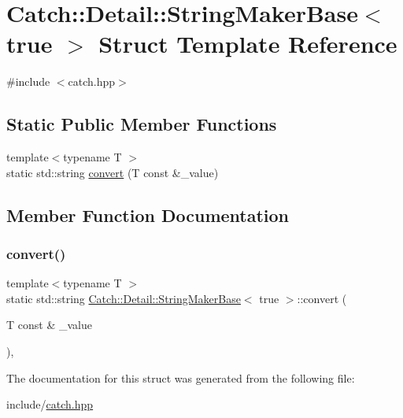 \hypertarget{struct_catch_1_1_detail_1_1_string_maker_base_3_01true_01_4}{}\section{Catch\+:\+:Detail\+:\+:String\+Maker\+Base$<$ true $>$ Struct Template Reference}
\label{struct_catch_1_1_detail_1_1_string_maker_base_3_01true_01_4}


{\ttfamily \#include $<$catch.\+hpp$>$}

\subsection*{Static Public Member Functions}
\begin{DoxyCompactItemize}
\item 
{\footnotesize template$<$typename T $>$ }\\static std\+::string \mbox{\hyperlink{struct_catch_1_1_detail_1_1_string_maker_base_3_01true_01_4_af9b5fdf7fddd8c5c873caa819e5f00f6}{convert}} (T const \&\+\_\+value)
\end{DoxyCompactItemize}


\subsection{Member Function Documentation}
\mbox{\label{struct_catch_1_1_detail_1_1_string_maker_base_3_01true_01_4_af9b5fdf7fddd8c5c873caa819e5f00f6}} 
\subsubsection{\texorpdfstring{convert()}{convert()}}
{\footnotesize\ttfamily template$<$typename T $>$ \\
static std\+::string \mbox{\hyperlink{struct_catch_1_1_detail_1_1_string_maker_base}{Catch\+::\+Detail\+::\+String\+Maker\+Base}}$<$ true $>$\+::convert (\begin{DoxyParamCaption}\item[{T const \&}]{\+\_\+value }\end{DoxyParamCaption})\hspace{0.3cm}{\ttfamily [inline]}, {\ttfamily [static]}}



The documentation for this struct was generated from the following file\+:\begin{DoxyCompactItemize}
\item 
include/\mbox{\hyperlink{catch_8hpp}{catch.\+hpp}}\end{DoxyCompactItemize}
